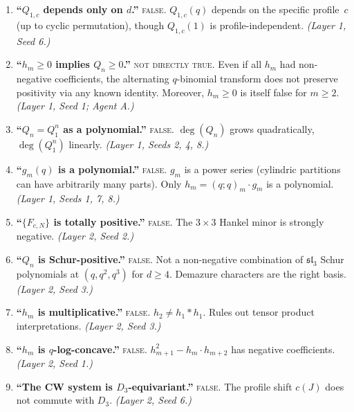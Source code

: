\documentclass[11pt]{article}
\theoremstyle{definition}
\begin{document}
\begin{enumerate}[label=\textbf{BA\arabic*.}, leftmargin=2.5em]

\item \textbf{``$Q_{1,c}$ depends only on $d$.''} \textsc{false}. $Q_{1,c}(q)$ depends on the specific profile~$c$ (up to cyclic permutation), though $Q_{1,c}(1)$ is profile-independent. \emph{(Layer 1, Seed 6.)}

\item \textbf{``$h_m \geq 0$ implies $Q_n \geq 0$.''} \textsc{not directly true}. Even if all $h_m$ had non-negative coefficients, the alternating $q$-binomial transform does not preserve positivity via any known identity. Moreover, $h_m \geq 0$ is itself false for $m \geq 2$. \emph{(Layer 1, Seed 1; Agent A.)}

\item \textbf{``$Q_n = Q_1^n$ as a polynomial.''} \textsc{false}. $\deg(Q_n)$ grows quadratically, $\deg(Q_1^n)$ linearly. \emph{(Layer 1, Seeds 2, 4, 8.)}

\item \textbf{``$g_m(q)$ is a polynomial.''} \textsc{false}. $g_m$ is a power series (cylindric partitions can have arbitrarily many parts). Only $h_m = (q;q)_m \cdot g_m$ is a polynomial. \emph{(Layer 1, Seeds 1, 7, 8.)}

\item \textbf{``$\{F_{c,N}\}$ is totally positive.''} \textsc{false}. The $3 \times 3$ Hankel minor is strongly negative. \emph{(Layer 2, Seed 2.)}

\item \textbf{``$Q_n$ is Schur-positive.''} \textsc{false}. Not a non-negative combination of $\mathfrak{sl}_3$ Schur polynomials at $(q, q^2, q^3)$ for $d \geq 4$. Demazure characters are the right basis. \emph{(Layer 2, Seed 3.)}

\item \textbf{``$h_m$ is multiplicative.''} \textsc{false}. $h_2 \neq h_1 \ast h_1$. Rules out tensor product interpretations. \emph{(Layer 2, Seed 3.)}

\item \textbf{``$h_m$ is $q$-log-concave.''} \textsc{false}. $h_{m+1}^2 - h_m \cdot h_{m+2}$ has negative coefficients. \emph{(Layer 2, Seed 1.)}

\item \textbf{``The CW system is $D_3$-equivariant.''} \textsc{false}. The profile shift $c(J)$ does not commute with $D_3$. \emph{(Layer 2, Seed 6.)}


\end{enumerate}
\end{document}
